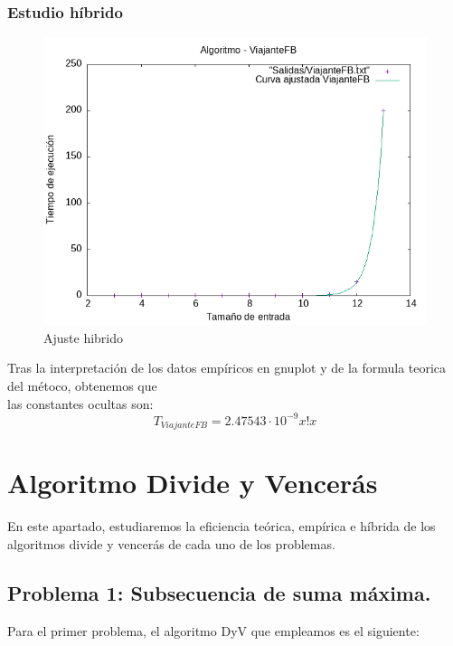 \documentclass[11pt,openany]{book}
\begin{document}
\subsection{Estudio híbrido}
\begin{center}
      \begin{figure}[H]
                  \centering
                  \includegraphics[width=0.7\linewidth]{assets/Img/ViajanteFB_hib.png}
                  \caption{Ajuste hibrido}
                  \label{fig:ViajanteFBhibrido}
      \end{figure}
\end{center}
Tras la interpretación de los datos empíricos en gnuplot y de la formula teorica del métoco, obtenemos que \\
las constantes ocultas son:
\begin{equation*}
      T_{ViajanteFB}=2.47543 \cdot 10^{-9}x!x
\end{equation*}



\chapter{Algoritmo Divide y Vencerás}
En este apartado, estudiaremos la eficiencia teórica, empírica e híbrida de los algoritmos divide y vencerás
de cada uno de los problemas.
\section{Problema 1: Subsecuencia de suma máxima.}
Para el primer problema, el algoritmo DyV que empleamos es el siguiente:
\end{document}
